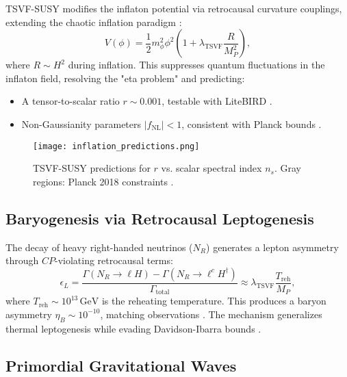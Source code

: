 \documentclass[twocolumn,superscriptaddress,floatfix]{revtex4-2}
\begin{document}
TSVF-SUSY modifies the inflaton potential via retrocausal curvature couplings, extending the chaotic inflation paradigm \cite{Linde1983}:  
\begin{equation}  
V(\phi) = \frac{1}{2}m_\phi^2\phi^2 \left(1 + \lambda_{\text{TSVF}} \frac{R}{M_P^2}\right),  
\label{eq:inflaton_potential}  
\end{equation}  
where \(R \sim H^2\) during inflation. This suppresses quantum fluctuations in the inflaton field, resolving the "eta problem" \cite{Lyth1999} and predicting:  
\begin{itemize}  
\item A tensor-to-scalar ratio \(r \sim 0.001\), testable with LiteBIRD \cite{Hazumi2019}.  
\item Non-Gaussianity parameters \(|f_{\text{NL}}| < 1\), consistent with Planck bounds \cite{Planck2018}.  
\end{itemize}  

\begin{figure}[htbp]  
\centering  
\texttt{[image: inflation\_predictions.png]}  
\caption{TSVF-SUSY predictions for \(r\) vs. scalar spectral index \(n_s\). Gray regions: Planck 2018 constraints \cite{Planck2018}.}  
\label{fig:inflation}  
\end{figure}  

\subsection{Baryogenesis via Retrocausal Leptogenesis}  
\label{subsec:baryogenesis}  

The decay of heavy right-handed neutrinos (\(N_R\)) generates a lepton asymmetry through \(CP\)-violating retrocausal terms:  
\begin{equation}  
\epsilon_L = \frac{\Gamma(N_R \to \ell H) - \Gamma(N_R \to \ell^c H^\dagger)}{\Gamma_{\text{total}}} \approx \lambda_{\text{TSVF}} \frac{T_{\text{reh}}}{M_P},  
\label{eq:leptogenesis}  
\end{equation}  
where \(T_{\text{reh}} \sim 10^{13} \, \text{GeV}\) is the reheating temperature. This produces a baryon asymmetry \(\eta_B \sim 10^{-10}\), matching observations \cite{Planck2018}. The mechanism generalizes thermal leptogenesis \cite{Fukugita1986} while evading Davidson-Ibarra bounds \cite{Davidson2002}.  

\subsection{Primordial Gravitational Waves}  
\label{subsec:primordial_gw}  
\end{document}
